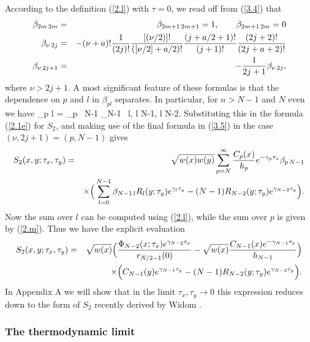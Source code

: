 According to the 
definition (\ref{2.l}) with $\tau = 0$, we read off from (\ref{3.4}) that 
\begin{eqnarray}\label{3.5}
\beta_{2m \, 2m} & = & \beta_{2m+1 \, 2m+1} = 1, \qquad
\beta_{2m+1 \, 2m} = 0 \nonumber \\
\beta_{\nu \, 2j} & = & - (\nu + a)! {1 \over (2j)!}
{[(\nu/2)]! \over ([\nu/2] + a/2)!}
{(j + a/2 + 1)! \over (j+1)!} {(2j+2)! \over (2j+a+2)!} \\
\beta_{\nu \, 2j+1} & = & - {1 \over 2j + 1} \beta_{\nu \, 2j},
\end{eqnarray}
where $\nu > 2j + 1$. A most significant feature  of these formulas is that the 
dependence on $p$ and $l$ 
in $\beta_{pl}$ separates. In particular, for $n > N - 1$ and 
$N$ even we have 
\beqa
\label{3.6}
\beta_{p l} = \beta_{p \, N-1} \beta_{N-1 \, l},  \le l \le N-1, \: l \ne N-2.
\eeqa
Substituting this in the 
formula (\ref{2.1e}) for $S_{2}$, and making use of the final 
formula in (\ref{3.5}) in the case $(\nu, 2j + 1) = (p, N - 1)$ gives 
\begin{eqnarray}
\label{3.7}
S_2(x,y;\tau_x,\tau_y) & = & \sqrt{w(x) w(y)} \sum_{p=N}^\infty
{C_p(x) \over h_p} e^{-\gamma_p \tau_x} \beta_{p \, N-1}
\nonumber
\\ && \times \Big ( \sum_{l=0}^{N-1} \beta_{N-1 \, l} R_l(y;\tau_y)
e^{\gamma_l \tau_y} - (N-1) R_{N-2}(y;\tau_y) e^{\gamma_{N-2} \tau_y}
\Big ).
\end{eqnarray}
Now the sum 
over $l$ can be computed using (\ref{2.l}), while the sum over $p$ is 
given by (\ref{2.m}). Thus we have the explicit evaluation 
\begin{eqnarray} 
\label{3.8}
S_2(x,y;\tau_x,\tau_y) & = & \sqrt{w(x)}
\Big ( {\Phi_{N-2}(x;\tau_x) e^{\gamma_{N-2} \tau_x} \over
r_{N/2 - 1}(0)}  - \sqrt{w(x)}
{C_{N-1}(x) e^{-\gamma_{N-1} \tau_x} \over h_{N-1}} \Big )
\nonumber \\
&& \times \Big ( C_{N-1}(y) e^{\gamma_{N-1} \tau_y} -
(N - 1) R_{N-2}(y;\tau_y) e^{\gamma_{N-2} \tau_y} \Big ).
\end{eqnarray}
In  Appendix A we will 
show that in the limit $\tau_{x}, \tau_{y} \rightarrow 0$ 
this expression reduces down to the form of $S_{2}$ recently derived by 
Widom \cite{Wi98}. 

\subsubsection{The thermodynamic limit} 


